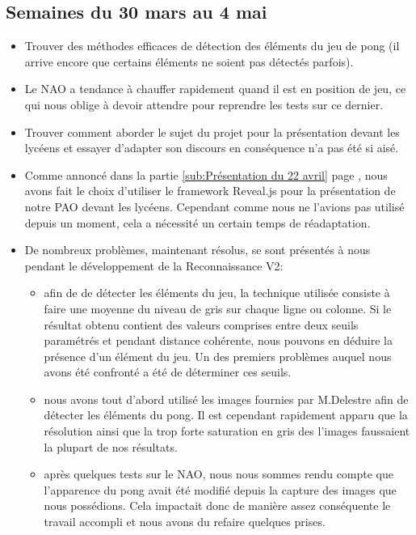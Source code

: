   \subsection{Semaines du 30 mars au 4 mai}
  \label{sub:Semaines du 30 mars au 4 mai}
    \begin{itemize}
      \item Trouver des méthodes efficaces de détection des éléments du jeu de pong (il arrive encore que certains éléments ne soient pas détectés parfois).
      \item Le NAO a tendance à chauffer rapidement quand il est en position de jeu, ce qui nous oblige à devoir attendre pour reprendre les tests sur ce dernier.
      \item Trouver comment aborder le sujet du projet pour la présentation devant les lycéens et essayer d’adapter son discours en conséquence n’a pas été si aisé.
      \item Comme annoncé dans la partie \ref{sub:Présentation du 22 avril} page \pageref{sub:Présentation du 22 avril}, nous avons fait le choix d’utiliser le framework Reveal.js pour la présentation de notre PAO devant les lycéens.
      Cependant comme nous ne l’avions pas utilisé depuis un moment, cela a nécessité un certain temps de réadaptation.
      \item De nombreux problèmes, maintenant résolus, se sont présentés à nous pendant le développement de la Reconnaissance V2:
            \begin{itemize}
              \item afin de de détecter les éléments du jeu, la technique utilisée consiste à faire une moyenne du niveau de gris sur chaque ligne ou colonne.
              Si le résultat obtenu contient des valeurs comprises entre deux seuils paramétrés et pendant distance cohérente, nous pouvons en déduire la présence d’un élément du jeu.
              Un des premiers problèmes auquel nous avons été confronté a été de déterminer ces seuils.
              \item nous avons tout d’abord utilisé les images fournies par M.Delestre afin de détecter les éléments du pong.
              Il est cependant rapidement apparu que la résolution ainsi que la trop forte saturation en gris des l’images faussaient la plupart de nos résultats.
              \item après quelques tests sur le NAO, nous nous sommes rendu compte que l’apparence du pong avait été modifié depuis la capture des images que nous possédions.
              Cela impactait donc de manière assez conséquente le travail accompli et nous avons du refaire quelques prises.

\end{itemize}
\end{itemize}
